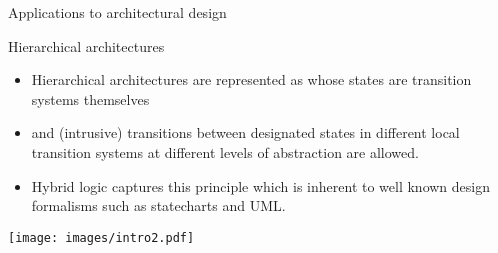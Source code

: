\documentclass{beamer}
\begin{document}
\begin{slide}{Applications to architectural design}\label{s:57}
\small

\vspace{0.3cm}

\begin{block}{Hierarchical  architectures}
\begin{itemize}
\item Hierarchical  architectures are represented as  whose
 states are transition systems themselves 
\item and (intrusive)  transitions between designated states in different local transition systems at different levels of abstraction are allowed.
\item  Hybrid logic captures this principle which is inherent to well known design formalisms such as  statecharts and  UML.
\end{itemize}
\end{block}
\vspace{-0.2cm}
\begin{center}
  \texttt{[image: images/intro2.pdf]}
\end{center}

\end{slide}
\end{document}
